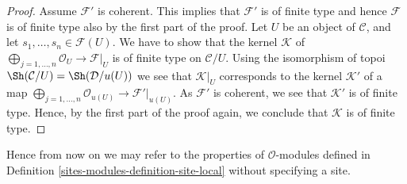 \begin{proof}
\medskip\noindent
Assume $\mathcal{F}'$ is coherent. This implies that $\mathcal{F}'$
is of finite type and hence $\mathcal{F}$ is of finite type also by the
first part of the proof. Let $U$ be an object of $\mathcal{C}$, and let
$s_1, \ldots, s_n \in \mathcal{F}(U)$. We have to show that the kernel
$\mathcal{K}$ of
$\bigoplus_{j = 1, \ldots, n} \mathcal{O}_U \to \mathcal{F}|_U$
is of finite type on $\mathcal{C}/U$. Using the isomorphism of topoi
$\Sh(\mathcal{C}/U) = \Sh(\mathcal{D}/u(U))$
we see that $\mathcal{K}|_U$ corresponds to the kernel
$\mathcal{K}'$ of a map
$\bigoplus_{j = 1, \ldots, n} \mathcal{O}_{u(U)} \to \mathcal{F}'|_{u(U)}$.
As $\mathcal{F}'$ is coherent, we see that $\mathcal{K}'$ is of finite
type. Hence, by the first part of the proof again, we conclude
that $\mathcal{K}$ is of finite type.
\end{proof}

Hence from now on we may refer to the properties of $\mathcal{O}$-modules
defined in Definition \ref{sites-modules-definition-site-local} without specifying a site.

